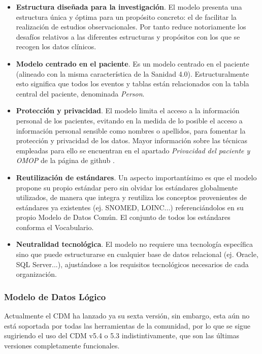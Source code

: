 \begin{itemize}
    \item \textbf{Estructura diseñada para la investigación}. 
    El modelo presenta una estructura única y óptima para un propósito concreto: el de facilitar la realización de estudios observacionales. Por tanto reduce notoriamente los desafíos relativos a las diferentes estructuras y propósitos con los que se recogen los datos clínicos.
    \item \textbf{Modelo centrado en el paciente}. Es un modelo centrado en el paciente (alineado con la misma característica de la Sanidad 4.0). Estructuralmente esto significa que todos los eventos y tablas están relacionados con la tabla central del paciente, denominada \textit{Person}. 
    \item \textbf{Protección y privacidad}. El modelo limita el acceso a la información personal de los pacientes, evitando en la medida de lo posible el acceso a información personal sensible como nombres o apellidos, para fomentar la protección y privacidad de los datos. Mayor información sobre las técnicas empleadas para ello se encuentran en el apartado \textit{Privacidad del paciente y OMOP} de la página de github \parencite{gitPagesCMD}.
    \item \textbf{Reutilización de estándares}. Un aspecto importantísimo es que el modelo propone su propio estándar pero sin olvidar los estándares globalmente utilizados, de manera que integra y reutiliza los conceptos provenientes de estándares ya existentes (ej. SNOMED, LOINC...) referenciándolos en su propio Modelo de Datos Común. El conjunto de todos los estándares conforma el Vocabulario.
    \item \textbf{Neutralidad tecnológica}. El modelo no requiere una tecnología específica sino que puede estructurarse en cualquier base de datos relacional (ej. Oracle, SQL Server...), ajustándose a los requisitos tecnológicos necesarios de cada organización.
    
\end{itemize}

\subsubsection{Modelo de Datos Lógico}

Actualmente el CDM ha lanzado ya su sexta versión, sin embargo, esta aún no está soportada por todas las herramientas de la comunidad, por lo que se sigue sugiriendo el uso del CDM v5.4 o 5.3 indistintivamente, que son las últimas versiones completamente funcionales. 

